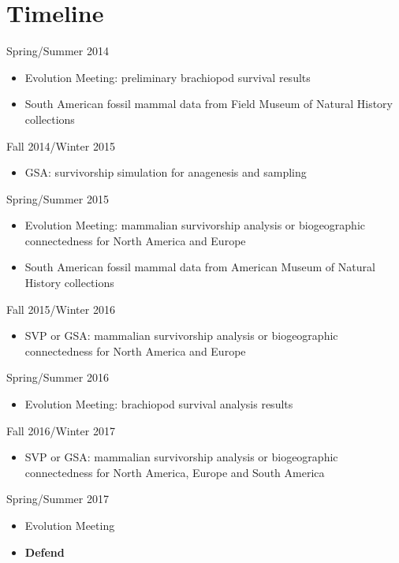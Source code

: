 \documentclass[12pt,letterpaper]{article}
\begin{document}
\clearpage
\section{Timeline}

Spring/Summer 2014
\begin{itemize}
  \item Evolution Meeting: preliminary brachiopod survival results
  \item South American fossil mammal data from Field Museum of Natural History collections
\end{itemize}

Fall 2014/Winter 2015
\begin{itemize}
  \item GSA: survivorship simulation for anagenesis and sampling
\end{itemize}

Spring/Summer 2015
\begin{itemize}
  \item Evolution Meeting: mammalian survivorship analysis or biogeographic connectedness for North America and Europe
  \item South American fossil mammal data from American Museum of Natural History collections
\end{itemize}

Fall 2015/Winter 2016
\begin{itemize}
  \item SVP or GSA: mammalian survivorship analysis or biogeographic connectedness for North America and Europe
\end{itemize}

Spring/Summer 2016
\begin{itemize}
  \item Evolution Meeting: brachiopod survival analysis results
\end{itemize}

Fall 2016/Winter 2017
\begin{itemize}
  \item SVP or GSA: mammalian survivorship analysis or biogeographic connectedness for North America, Europe and South America
\end{itemize}

Spring/Summer 2017
\begin{itemize}
  \item Evolution Meeting
  \item \textbf{Defend}
\end{itemize}



\clearpage


\end{document}

